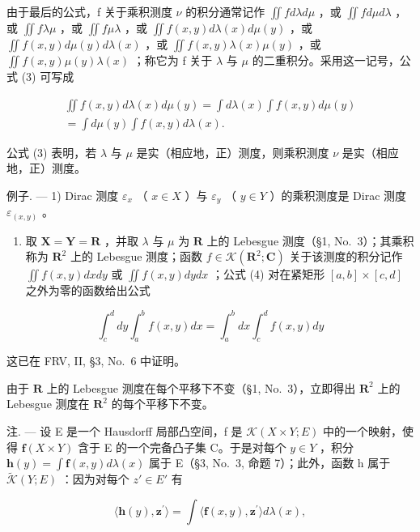 由于最后的公式，f 关于乘积测度 \(\nu\) 的积分通常记作 \(\iint f d\lambda d\mu\) ，或 \(\iint f d\mu d\lambda\) ，或 \(\iint f \lambda \mu\) ，或 \(\iint f \mu \lambda\) ，或 \(\iint f(x, y) d\lambda(x) d\mu(y)\) ，或 \(\iint f(x, y) d\mu(y) d\lambda(x)\) ，或 \(\iint f(x, y) \lambda(x)\mu(y)\) ，或 \(\iint f(x, y) \mu(y)\lambda(x)\) ；称它为 f 关于 \(\lambda\) 与 \(\mu\) 的二重积分。采用这一记号，公式 (3) 可写成

\[
\begin{array}{c} \iint f (x, y) d \lambda (x) d \mu (y) = \int d \lambda (x) \int f (x, y) d \mu (y) \\ = \int d \mu (y) \int f (x, y) d \lambda (x). \end{array}\tag{4}
\]

公式 (3) 表明，若 \(\lambda\) 与 \(\mu\) 是实（相应地，正）测度，则乘积测度 \(\nu\) 是实（相应地，正）测度。

例子. --- 1) Dirac 测度 \(\varepsilon_{x}\) （ \(x \in X\) ）与 \(\varepsilon_{y}\) （ \(y \in Y\) ）的乘积测度是 Dirac 测度 \(\varepsilon_{(x,y)}\) 。

\begin{enumerate}
\def\labelenumi{\arabic{enumi})}
\setcounter{enumi}{1}
\tightlist
\item
  取 \(\mathbf{X} = \mathbf{Y} = \mathbf{R}\) ，并取 \(\lambda\) 与 \(\mu\) 为 \(\mathbf{R}\) 上的 Lebesgue 测度（§1, No.~3）；其乘积称为 \(\mathbf{R}^2\) 上的 Lebesgue 测度；函数 \(f \in \mathcal{K}(\mathbf{R}^2; \mathbf{C})\) 关于该测度的积分记作 \(\iint f(x, y) dx dy\) 或 \(\iint f(x, y) dy dx\) ；公式 (4) 对在紧矩形 \([a, b] \times [c, d]\) 之外为零的函数给出公式
\end{enumerate}

\[
\int_ {c} ^ {d} d y \int_ {a} ^ {b} f (x, y) d x = \int_ {a} ^ {b} d x \int_ {c} ^ {d} f (x, y) d y
\]

这已在 FRV, II, §3, No.~6 中证明。

由于 \(\mathbf{R}\) 上的 Lebesgue 测度在每个平移下不变（§1, No.~3），立即得出 \(\mathbf{R}^2\) 上的 Lebesgue 测度在 \(\mathbf{R}^2\) 的每个平移下不变。

注. --- 设 E 是一个 Hausdorff 局部凸空间，f 是 \(\mathcal{K}(X \times Y; E)\) 中的一个映射，使得 \(\mathbf{f}(X \times Y)\) 含于 E 的一个完备凸子集 C。于是对每个 \(y \in Y\) ，积分 \(\mathbf{h}(y) = \int \mathbf{f}(x, y) d\lambda(x)\) 属于 E（§3, No.~3, 命题 7）；此外，函数 h 属于 \(\widetilde{\mathcal{K}}(Y; E)\) ：因为对每个 \(z' \in E'\) 有

\[
\langle \mathbf {h} (y), \mathbf {z} ^ {\prime} \rangle = \int \langle \mathbf {f} (x, y), \mathbf {z} ^ {\prime} \rangle d \lambda (x),
\]

